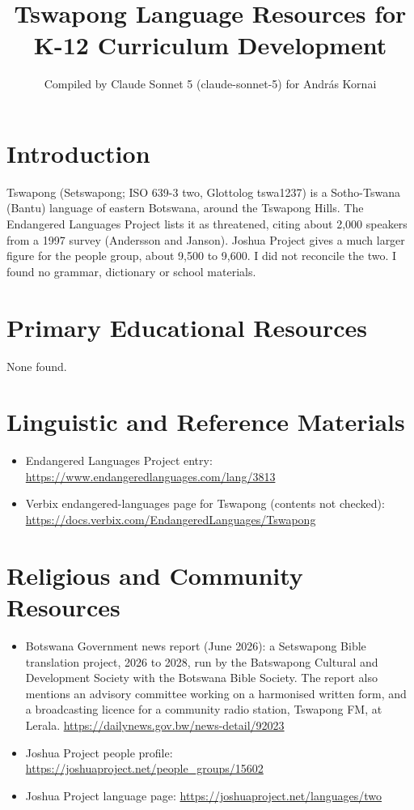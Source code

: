 \documentclass[12pt]{article}
\title{Tswapong Language Resources for K-12 Curriculum Development}
\author{Compiled by Claude Sonnet 5 (claude-sonnet-5) for Andr\'as Kornai}
\date{}
\begin{document}
\maketitle

\section{Introduction}
Tswapong (Setswapong; ISO 639-3 two, Glottolog tswa1237) is a Sotho-Tswana (Bantu) language of eastern Botswana, around the Tswapong Hills. The Endangered Languages Project lists it as threatened, citing about 2,000 speakers from a 1997 survey (Andersson and Janson). Joshua Project gives a much larger figure for the people group, about 9,500 to 9,600. I did not reconcile the two. I found no grammar, dictionary or school materials.

\section{Primary Educational Resources}
None found.

\section{Linguistic and Reference Materials}
\begin{itemize}
\item Endangered Languages Project entry: \url{https://www.endangeredlanguages.com/lang/3813}
\item Verbix endangered-languages page for Tswapong (contents not checked): \url{https://docs.verbix.com/EndangeredLanguages/Tswapong}
\end{itemize}

\section{Religious and Community Resources}
\begin{itemize}
\item Botswana Government news report (June 2026): a Setswapong Bible translation project, 2026 to 2028, run by the Batswapong Cultural and Development Society with the Botswana Bible Society. The report also mentions an advisory committee working on a harmonised written form, and a broadcasting licence for a community radio station, Tswapong FM, at Lerala. \url{https://dailynews.gov.bw/news-detail/92023}
\item Joshua Project people profile: \url{https://joshuaproject.net/people_groups/15602}
\item Joshua Project language page: \url{https://joshuaproject.net/languages/two}
\end{itemize}
\end{document}

